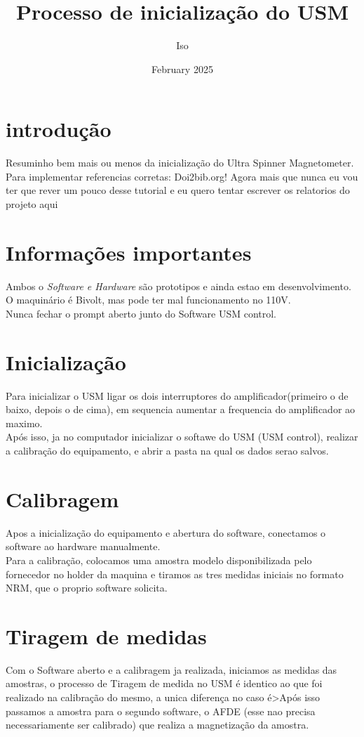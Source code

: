 \documentclass{paper}[geophysics]
\title{Processo de inicialização do USM}
\author{ Iso }
\date{February 2025}
\begin{document}
\maketitle

\section{introdução}
  Resuminho bem mais ou menos da inicialização do Ultra Spinner Magnetometer.\\
  Para implementar referencias corretas: Doi2bib.org!
  Agora mais que nunca eu vou ter que rever um pouco desse tutorial e eu quero tentar escrever os relatorios do projeto aqui
	
\section{Informações importantes}
Ambos o \emph{Software e Hardware} são prototipos e ainda estao em desenvolvimento.\\
O maquinário é Bivolt, mas pode ter mal funcionamento no 110V.\\
Nunca fechar o prompt aberto junto do Software USM control.\\

\section{Inicialização}
Para inicializar o USM ligar os dois interruptores do amplificador(primeiro o de baixo, depois o de cima), em sequencia aumentar a frequencia do amplificador ao maximo.\\
Após isso, ja no computador inicializar o softawe do USM (USM control), realizar a calibração do equipamento, e abrir a pasta na qual os dados serao salvos.

\section{Calibragem}
Apos a inicialização do equipamento e abertura do software, conectamos o software ao hardware manualmente.\\
Para a calibração, colocamos uma amostra modelo disponibilizada pelo fornecedor no holder da maquina e tiramos as tres medidas iniciais no formato NRM, que o proprio software solicita.

\section{Tiragem de medidas}
Com o Software aberto e a calibragem ja realizada, iniciamos as medidas das amostras, o processo de Tiragem de medida no USM é identico ao que foi realizado na calibração do mesmo, a unica diferença no caso é>Após isso passamos a amostra para o segundo software, o AFDE (esse nao precisa necessariamente ser calibrado) que realiza a magnetização da amostra.
\end{document}
